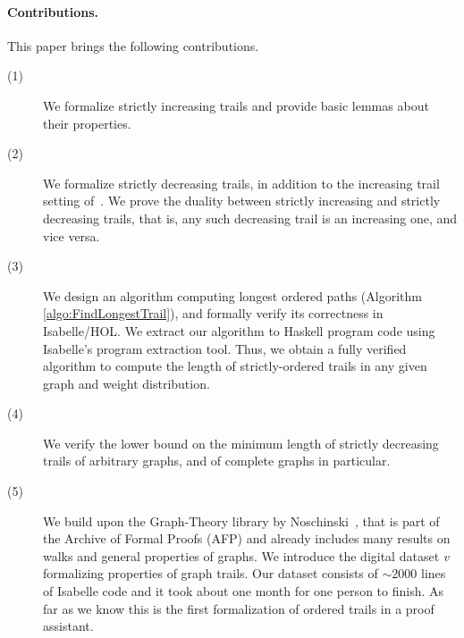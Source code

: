 \begin{isabellebody}
\begin{isamarkuptext}
\noindent\paragraph{\bf Contributions.} This paper brings the following contributions.
\begin{description}
\item[(1)]
We formalize strictly increasing trails and provide basic lemmas about their
properties.
\item[(2)] We formalize strictly decreasing trails, in addition to the increasing trail setting of~\cite{graham1973increasing}. 
We prove the duality between strictly increasing and strictly decreasing trails, that is, any such decreasing trail is an increasing one, and vice versa.
\item[(3)] We design an algorithm computing longest ordered paths (Algorithm \ref{algo:FindLongestTrail}), and formally verify  its correctness in Isabelle/HOL.
We extract our algorithm to Haskell program code using Isabelle's program extraction tool. Thus, we obtain a fully verified algorithm to compute the length
of strictly-ordered trails in any given graph and weight distribution.
\item[(4)] We
verify the lower bound on
the minimum length of strictly decreasing trails of arbitrary graphs, and of complete graphs in particular.
\item[(5)] We build upon the Graph-Theory library by Noschinski~\cite{Graph_Theory-AFP},  that is part of the
Archive of Formal Proofs (AFP) and already includes many results on walks and
general properties of graphs. We introduce the digital dataset {\it v} formalizing properties of graph trails. Our dataset  consists of
$\sim$2000 lines of Isabelle code and it took about one month for one person to finish. As far as we know this is the first formalization of
ordered trails in a proof assistant.
\end{description}


\end{isamarkuptext}
\end{isabellebody}
